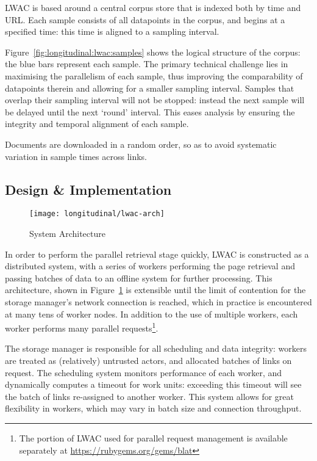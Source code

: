 LWAC is based around a central corpus store that is indexed both by time and URL\@.  Each sample consists of all datapoints in the corpus, and begins at a specified time: this time is aligned to a sampling interval.

Figure~\ref{fig:longitudinal:lwac:samples} shows the logical structure of the corpus: the blue bars represent each sample.  The primary technical challenge lies in maximising the parallelism of each sample, thus improving the comparability of datapoints therein and allowing for a smaller sampling interval.  Samples that overlap their sampling interval will not be stopped: instead the next sample will be delayed until the next `round' interval.  This eases analysis by ensuring the integrity and temporal alignment of each sample.

Documents are downloaded in a random order, so as to avoid systematic variation in sample times across links.



\subsection{Design \& Implementation}


\begin{figure}[Ht]
    \centering
    \texttt{[image: longitudinal/lwac-arch]}
    \caption{System Architecture}
    \label{fig:longitudinal:lwac:arch}
\end{figure}


In order to perform the parallel retrieval stage quickly, LWAC is constructed as a distributed system, with a series of workers performing the page retrieval and passing batches of data to an offline system for further processing.  This architecture, shown in Figure~\ref{fig:longitudinal:lwac:arch} is extensible until the limit of contention for the storage manager's network connection is reached, which in practice is encountered at many tens of worker nodes.  In addition to the use of multiple workers, each worker performs many parallel requests\footnote{The portion of LWAC used for parallel request management is available separately at \url{https://rubygems.org/gems/blat}}.

The storage manager is responsible for all scheduling and data integrity: workers are treated as (relatively) untrusted actors, and allocated batches of links on request.  The scheduling system monitors performance of each worker, and dynamically computes a timeout for work units: exceeding this timeout will see the batch of links re-assigned to another worker.  This system allows for great flexibility in workers, which may vary in batch size and connection throughput.

